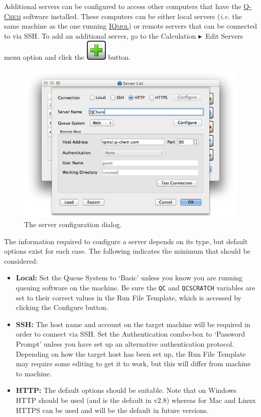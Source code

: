 \documentclass[a4paper,12pt]{article}
\newcommand{\qchem}{\href{https://q-chem.com}{{\scshape Q-Chem}}}
\newcommand{\iqmol}{\href{https://www.iqmol.org}{{\scshape IQmol}}}
\newcommand{\bt}{\ensuremath{\blacktriangleright}}
\begin{document}
Additional servers can be configured to access other computers that have the
\qchem{} software installed.  These computers can be either local servers
(\emph{i.e.} the same machine as the one running \iqmol{}) or remote servers
that can be connected to via SSH.  To add an additional server, go to the
Calculation \bt\ Edit Servers menu option and click the
\includegraphics[scale=0.40]{figures/PlusButton.png} button.  
\begin{figure}
\begin{center}
\includegraphics[scale=0.5]{figures/ServerDialog.png}
\caption{The server configuration dialog.}
\end{center}
\end{figure}

The information required to configure a server depends on its type, but default
options exist for each case.  The following indicates the minimum that should
be considered:

\begin{itemize}
\item {\bf Local:} Set the Queue System to `Basic'
      unless you know you are running queuing software on the machine.
      Be sure the {\tt QC} and {\tt QCSCRATCH} variables are set to their correct
	  values in the Run File Template, which is accessed by clicking the Configure
      button.
\item {\bf SSH:} The host name and account on the target machine will 
      be required in order to connect via SSH.  Set the Authentication combo-box to
      `Password Prompt' unless you have set up an alternative authentication protocol.
	  Depending on how the target host has been set up, the Run File Template
	  may require some editing to get it to work, but this will differ from
      machine to machine.
\item {\bf HTTP:} The default options should be suitable.  Note that on Windows
	  HTTP should be used (and is the default in v2.8) whereas for Mac and
      Linux HTTPS can be used and will be the default in future versions.  
\end{itemize}
\end{document}
